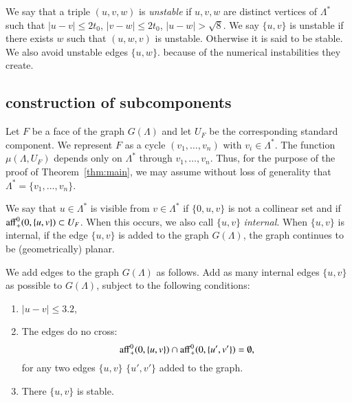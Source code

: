 We say that a triple $(u,v,w)$ is {\it unstable}
if $u,v,w$ are distinct vertices of $\Lambda^*$ such
that $|u-v|\le 2t_0$, $|v-w|\le 2t_0$, $|u-w|>\sqrt8$.
We say $\{u,v\}$ is unstable if there exists $w$ such that $(u,w,v)$
is unstable.  Otherwise it is said to be stable.
We also avoid unstable edges $\{u,w\}$.
because of the numerical instabilities they create.


\subsection{construction of subcomponents}

Let $F$ be a face of the graph $G(\Lambda)$ and let $U_F$ be the
corresponding standard component.  We represent $F$ as a cycle
$(v_1,\ldots,v_n)$ with $v_i\in\Lambda^*$.  The function
$\mu(\Lambda,U_F)$ depends only on $\Lambda^*$ through
$v_1,\ldots,v_n$.  Thus, for the purpose of the proof of
Theorem~\ref{thm:main}, we may assume without loss of generality
that $\Lambda^* = \{v_1,\ldots,v_n\}$.

We say that $u\in\Lambda^*$ is visible from $v\in\Lambda^*$ if
$\{0,u,v\}$ is not a collinear set and if
${\operatorname{aff}}_+^0(0,\{u,v\})\subset U_F$.  When this occurs, we
also call $\{u,v\}$ {\it internal}.  When $\{u,v\}$
is  internal, if the edge $\{u,v\}$ is added to the
graph $G(\Lambda)$, the graph continues to be (geometrically) planar.



We add edges to the graph $G(\Lambda)$ 
as follows.  
Add as many internal edges $\{u,v\}$ as possible to $G(\Lambda)$, subject
to the following conditions:
\begin{enumerate}
\item  $|u-v|\le3.2$, 
\item The edges do no cross:
  \begin{equation}\label{eqn:nonc}
  {\operatorname{aff}}_+^0(0,\{u,v\}) \cap {\operatorname{aff}}_+^0(0,\{u',v'\}) = \emptyset,
  \end{equation}
for any two edges $\{u,v\}$ $\{u',v'\}$ added to the graph.
\item There $\{u,v\}$ is stable.
\end{enumerate}  

